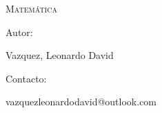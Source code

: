 




\centering
\hspace{10pt}

\begin{figure}[h]
\centering
{}
\label{1.0}
\end{figure}


{\scshape\Huge  \par}
{\scshape\Huge Matemática \par}
\vspace{1cm}

{\Large Autor: \par}
{\Large Vazquez, Leonardo David \par}
\vspace{1cm}

{\Large Contacto: \par}
{\Large vazquezleonardodavid@outlook.com \par}
\vspace{1cm}
